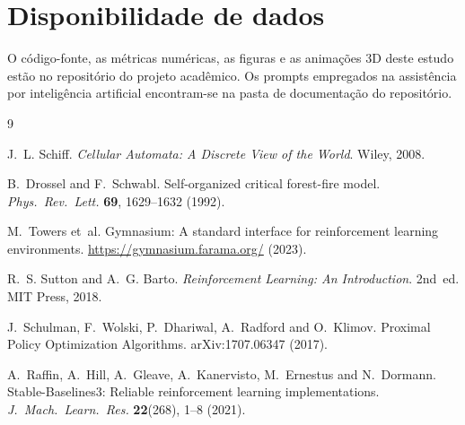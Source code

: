 \documentclass[11pt,a4paper]{article}
\begin{document}
\section*{Disponibilidade de dados}

O código-fonte, as métricas numéricas, as figuras e as animações 3D deste
estudo estão no repositório do projeto acadêmico.
Os prompts empregados na assistência por inteligência artificial encontram-se
na pasta de documentação do repositório.


\begin{thebibliography}{9}

J.~L. Schiff.
\newblock \emph{Cellular Automata: A Discrete View of the World}.
\newblock Wiley, 2008.

B.~Drossel and F.~Schwabl.
\newblock Self-organized critical forest-fire model.
\newblock \emph{Phys.\ Rev.\ Lett.} \textbf{69}, 1629--1632 (1992).

M.~Towers et~al.
\newblock Gymnasium: A standard interface for reinforcement learning
  environments.
\newblock \url{https://gymnasium.farama.org/} (2023).

R.~S. Sutton and A.~G. Barto.
\newblock \emph{Reinforcement Learning: An Introduction}.
\newblock 2nd~ed. MIT Press, 2018.

J.~Schulman, F.~Wolski, P.~Dhariwal, A.~Radford and O.~Klimov.
\newblock Proximal Policy Optimization Algorithms.
\newblock arXiv:1707.06347 (2017).

A.~Raffin, A.~Hill, A.~Gleave, A.~Kanervisto, M.~Ernestus and N.~Dormann.
\newblock Stable-Baselines3: Reliable reinforcement learning
  implementations.
\newblock \emph{J.\ Mach.\ Learn.\ Res.} \textbf{22}(268), 1--8 (2021).

\end{thebibliography}
\end{document}
